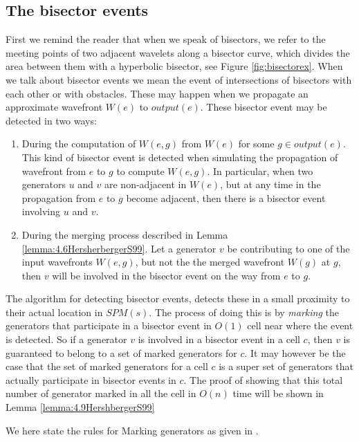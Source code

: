 \subsection{The bisector events} \label{section:bisectorevents}

First we remind the reader that when we speak of bisectors, we refer to the meeting points of 
two adjacent wavelets along a bisector curve, which divides the area between them with a 
hyperbolic bisector, see Figure \ref{fig:bisectorex}. When we talk about bisector events we 
mean the event of intersections of bisectors with each other or with obstacles. These may 
happen when we propagate an approximate wavefront $W(e)$ to $output(e)$. These bisector event 
may be detected in two ways:

\begin{enumerate}
\item During the computation of $W(e,g)$ from $W(e)$ for some $g \in output(e)$. This kind of 
	  bisector event is detected when simulating the propagation of wavefront from $e$ to $g$ 
      to compute $W(e,g)$. In particular, when two generators $u$ and $v$ are non-adjacent in 
      $W(e)$, but at any time in the propagation from $e$ to $g$ become adjacent, then there 
      is a bisector event involving $u$ and $v$.
\item During the merging process described in Lemma \ref{lemma:4.6HersherbergerS99}. Let a 
	  generator $v$ be contributing to one of the input wavefronts $W(e,g)$, but not the the 
      merged wavefront $W(g)$ at $g$, then $v$ will be involved in the bisector event on the 
      way from $e$ to $g$.
\end{enumerate}

The algorithm for detecting bisector events, detects these in a small proximity to their 
actual location in $SPM(s)$. The process of doing this is by \textit{marking} the generators 
that participate in a bisector event in $O(1)$ cell near where the event is detected. So if a 
generator $v$ is involved in a bisector event in a cell $c$, then $v$ is guaranteed to belong 
to a set of marked generators for $c$. It may however be the case that the set of marked 
generators for a cell $c$ is a super set of generators that actually participate in bisector 
events in $c$. The proof of showing that this total number of generator marked in all the cell 
in $O(n)$ time will be shown in Lemma \ref{lemma:4.9HershbergerS99}

We here state the rules for Marking generators as given in \cite{HershbergerS99}.


